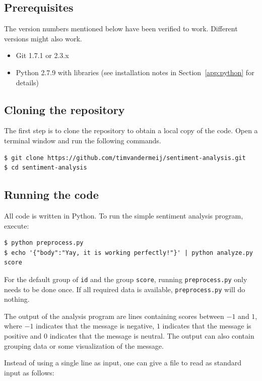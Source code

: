 \documentclass{article}
\begin{document}
\subsection{Prerequisites}\label{app:prerequisities}
The version numbers mentioned below have been verified to work. Different
versions might also work.

\begin{itemize}
  \item Git 1.7.1 or 2.3.x
  \item Python 2.7.9 with libraries (see installation notes in 
    Section~\ref{app:python} for details)
\end{itemize}

\subsection{Cloning the repository}\label{app:cloning-the-repository}
The first step is to clone the repository to obtain a local copy of the code. 
Open a terminal window and run the following commands.

\begin{verbatim}
$ git clone https://github.com/timvandermeij/sentiment-analysis.git
$ cd sentiment-analysis
\end{verbatim}

\subsection{Running the code}\label{app:running-the-code}
All code is written in Python. To run the simple sentiment analysis program, execute:

\begin{verbatim}
$ python preprocess.py
$ echo '{"body":"Yay, it is working perfectly!"}' | python analyze.py score
\end{verbatim}

For the default group of \texttt{id} and the group \texttt{score}, running
\texttt{preprocess.py} only needs to be done once. If all required data is
available, \texttt{preprocess.py} will do nothing.

The output of the analysis program are lines containing scores between $-1$ and 
$1$, where $-1$ indicates that the message is negative, $1$ indicates that the 
message is positive and $0$ indicates that the message is neutral. The output 
can also contain grouping data or some visualization of the message.

Instead of using a single line as input, one can give a file to read as standard
input as follows:
\end{document}
